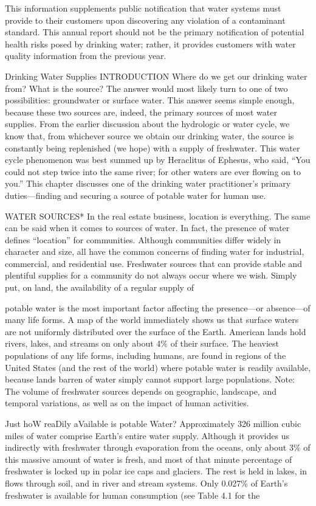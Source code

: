 \documentclass{article}
\begin{document}
This information supplements public notification that water systems must
provide to their customers upon discovering any violation of a
contaminant standard. This annual report should not be the primary
notification of potential health risks posed by drinking water; rather,
it provides customers with water quality information from the previous
year.

Drinking Water Supplies INTRODUCTION Where do we get our drinking water
from? What is the source? The answer would most likely turn to one of
two possibilities: groundwater or surface water. This answer seems
simple enough, because these two sources are, indeed, the primary
sources of most water supplies. From the earlier discussion about the
hydrologic or water cycle, we know that, from whichever source we obtain
our drinking water, the source is constantly being replenished (we hope)
with a supply of freshwater. This water cycle phenomenon was best summed
up by Heraclitus of Ephesus, who said, ``You could not step twice into
the same river; for other waters are ever flowing on to you.'' This
chapter discusses one of the drinking water practitioner's primary
duties---finding and securing a source of potable water for human use.

WATER SOURCES* In the real estate business, location is everything. The
same can be said when it comes to sources of water. In fact, the
presence of water defines ``location'' for communities. Although
communities differ widely in character and size, all have the common
concerns of finding water for industrial, commercial, and residential
use. Freshwater sources that can provide stable and plentiful supplies
for a community do not always occur where we wish. Simply put, on land,
the availability of a regular supply of

potable water is the most important factor affecting the presence---or
absence---of many life forms. A map of the world immediately shows us
that surface waters are not uniformly distributed over the surface of
the Earth. American lands hold rivers, lakes, and streams on only about
4\% of their surface. The heaviest populations of any life forms,
including humans, are found in regions of the United States (and the
rest of the world) where potable water is readily available, because
lands barren of water simply cannot support large populations. Note: The
volume of freshwater sources depends on geographic, landscape, and
temporal variations, as well as on the impact of human activities.

Just hoW reaDily aVailable is potable Water? Approximately 326 million
cubic miles of water comprise Earth's entire water supply. Although it
provides us indirectly with freshwater through evaporation from the
oceans, only about 3\% of this massive amount of water is fresh, and
most of that minute percentage of freshwater is locked up in polar ice
caps and glaciers. The rest is held in lakes, in flows through soil, and
in river and stream systems. Only 0.027\% of Earth's freshwater is
available for human consumption (see Table 4.1 for the
\end{document}

